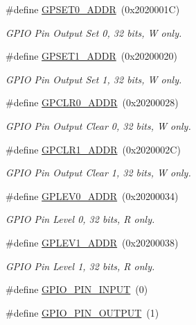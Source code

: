 \begin{DoxyCompactItemize}
\#define \hyperlink{group__GPIO_ga226a4472dd8e6b8cbb47961287241ea1}{G\+P\+S\+E\+T0\+\_\+\+A\+D\+DR}~(0x2020001\+C)
\begin{DoxyCompactList}\small\item\em G\+P\+IO Pin Output Set 0, 32 bits, W only. \end{DoxyCompactList}\item 
\#define \hyperlink{group__GPIO_gaaece09379857ff0604275597943a0cd4}{G\+P\+S\+E\+T1\+\_\+\+A\+D\+DR}~(0x20200020)
\begin{DoxyCompactList}\small\item\em G\+P\+IO Pin Output Set 1, 32 bits, W only. \end{DoxyCompactList}\item 
\#define \hyperlink{group__GPIO_gafbed74153e98c875a8495d6c132c56a6}{G\+P\+C\+L\+R0\+\_\+\+A\+D\+DR}~(0x20200028)
\begin{DoxyCompactList}\small\item\em G\+P\+IO Pin Output Clear 0, 32 bits, W only. \end{DoxyCompactList}\item 
\#define \hyperlink{group__GPIO_gae9f82a095f346ffd7ee0a7b6dfeac2c0}{G\+P\+C\+L\+R1\+\_\+\+A\+D\+DR}~(0x2020002\+C)
\begin{DoxyCompactList}\small\item\em G\+P\+IO Pin Output Clear 1, 32 bits, W only. \end{DoxyCompactList}\item 
\#define \hyperlink{group__GPIO_ga9a2f15ab8980c4a763dd9870950425a2}{G\+P\+L\+E\+V0\+\_\+\+A\+D\+DR}~(0x20200034)
\begin{DoxyCompactList}\small\item\em G\+P\+IO Pin Level 0, 32 bits, R only. \end{DoxyCompactList}\item 
\#define \hyperlink{group__GPIO_gafd408bfb4a12c49e73389a9004c532a0}{G\+P\+L\+E\+V1\+\_\+\+A\+D\+DR}~(0x20200038)
\begin{DoxyCompactList}\small\item\em G\+P\+IO Pin Level 1, 32 bits, R only. \end{DoxyCompactList}\item 
\#define \hyperlink{group__GPIO_gaaba3c3d6a54814218165f0994425a963}{G\+P\+I\+O\+\_\+\+P\+I\+N\+\_\+\+I\+N\+P\+UT}~(0)
\item 
\#define \hyperlink{group__GPIO_gaa91560b23a4da3a195982d9c4654580a}{G\+P\+I\+O\+\_\+\+P\+I\+N\+\_\+\+O\+U\+T\+P\+UT}~(1)
\item 

\end{DoxyCompactItemize}

